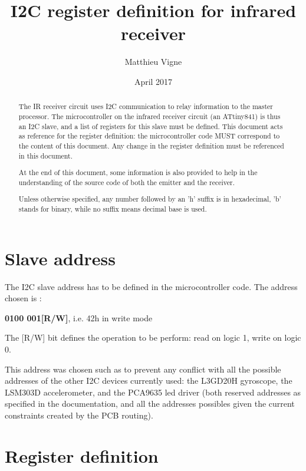 \documentclass[a4paper,11pt]{article}
\title{I2C register definition for infrared receiver}
\author{Matthieu Vigne}
\date{April 2017}
\begin{document}
\maketitle
\tableofcontents

\begin{abstract}
  
\indent \par The IR receiver circuit uses I2C communication to relay information to the master processor. The microcontroller on the infrared receiver circuit (an ATtiny841) is thus an I2C slave, and a list of registers for this slave must be defined. This document acts as reference for the register definition: the microcontroller code MUST correspond to the content of this document. Any change in the register definition must be referenced in this document.
\par At the end of this document, some information is also provided to help in the understanding of the source code of both the emitter and the receiver.

\par Unless otherwise specified, any number followed by an 'h' suffix is in hexadecimal, 'b' stands for binary, while no suffix means decimal base is used.
\end{abstract}

\section{Slave address}
\indent \par The I2C slave address has to be defined in the microcontroller code. The address chosen is :\\
\par \centerline{\textbf{0100 001[R/W]}, i.e. 42h in write mode}
\bigskip
\par The [R/W] bit defines the operation to be perform: read on logic 1, write on logic 0.
\par This address was chosen such as to prevent any conflict with all the possible addresses of the other I2C devices currently used: the L3GD20H gyroscope, the LSM303D accelerometer, and the PCA9635 led driver (both reserved addresses as specified in the documentation, and all the addresses possibles given the current constraints created by the PCB routing).

\section{Register definition}
\end{document}
